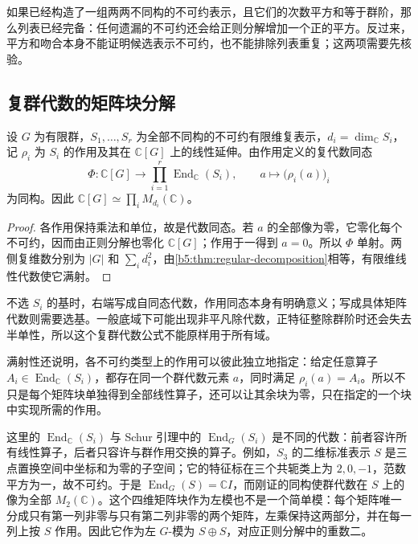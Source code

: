 \ProseParagraphBreak
如果已经构造了一组两两不同构的不可约表示，且它们的次数平方和等于群阶，那么列表已经完备：任何遗漏的不可约还会给正则分解增加一个正的平方。反过来，平方和吻合本身不能证明候选表示不可约，也不能排除列表重复；这两项需要先核验。

\subsection{复群代数的矩阵块分解}
\label{b5:subsec:0203:02}

\begin{theorem}\label{b5:thm:complex-group-algebra}
	设 \(G\) 为有限群，\(S_1,\ldots,S_r\) 为全部不同构的不可约有限维复表示，\(d_i=\dim_{\mathbb C}S_i\)，记 \(\rho_i\) 为 \(S_i\) 的作用及其在 \(\mathbb C[G]\) 上的线性延伸。由作用定义的复代数同态
	\[
		\Phi:\mathbb C[G]\longrightarrow\prod_{i=1}^r \operatorname{End}_{\mathbb C}(S_i),\qquad a\longmapsto\bigl(\rho_i(a)\bigr)_i
	\]
	为同构。因此 \(\mathbb C[G]\simeq\prod_i M_{d_i}(\mathbb C)\)。
\end{theorem}
\begin{proof}
	各作用保持乘法和单位，故是代数同态。若 \(a\) 的全部像为零，它零化每个不可约，因而由正则分解也零化 \(\mathbb C[G]\)；作用于一得到 \(a=0\)。所以 \(\Phi\) 单射。两侧复维数分别为 \(|G|\) 和 \(\sum_i d_i^2\)，由\cref{b5:thm:regular-decomposition}相等，有限维线性代数使它满射。
\end{proof}

不选 \(S_i\) 的基时，右端写成自同态代数，作用同态本身有明确意义；写成具体矩阵代数则需要选基。一般底域下可能出现非平凡除代数，正特征整除群阶时还会失去半单性，所以这个复群代数公式不能原样用于所有域。

\ProseParagraphBreak
满射性还说明，各不可约类型上的作用可以彼此独立地指定：给定任意算子 \(A_i\in\operatorname{End}_{\mathbb C}(S_i)\)，都存在同一个群代数元素 \(a\)，同时满足 \(\rho_i(a)=A_i\)。所以不只是每个矩阵块单独得到全部线性算子，还可以让其余块为零，只在指定的一个块中实现所需的作用。

\ProseParagraphBreak
这里的 \(\operatorname{End}_{\mathbb C}(S_i)\) 与 Schur 引理中的 \(\operatorname{End}_G(S_i)\) 是不同的代数：前者容许所有线性算子，后者只容许与群作用交换的算子。例如，\(S_3\) 的二维标准表示 \(S\) 是三点置换空间中坐标和为零的子空间；它的特征标在三个共轭类上为 \(2,0,-1\)，范数平方为一，故不可约。于是 \(\operatorname{End}_G(S)=\mathbb C I\)，而刚证的同构使群代数在 \(S\) 上的像为全部 \(M_2(\mathbb C)\)。这个四维矩阵块作为左模也不是一个简单模：每个矩阵唯一分成只有第一列非零与只有第二列非零的两个矩阵，左乘保持这两部分，并在每一列上按 \(S\) 作用。因此它作为左 \(G\)-模为 \(S\oplus S\)，对应正则分解中的重数二。

